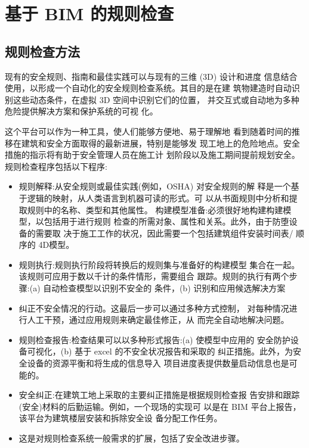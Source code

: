 \section{基于 BIM 的规则检查}
\subsection{规则检查方法}
现有的安全规则、指南和最佳实践可以与现有的三维 (3D) 设计和进度
信息结合使用，以形成一个自动化的安全规则检查系统。其目的是在建
筑物建造时自动识别这些动态条件，在虚拟 3D 空间中识别它们的位置，
并交互式或自动地为多种危险提供解决方案和保护系统的可视
化。

这个平台可以作为一种工具，使人们能够方便地、易于理解地
看到随着时间的推移在建筑和安全方面取得的最新进展，特别是能够发
现工地上的危险地点。安全措施的指示将有助于安全管理人员在施工计
划阶段以及施工期间提前规划安全。规则检查程序包括以下程序:

\begin{itemize}
    \item 规则解释:从安全规则或最佳实践(例如，OSHA) 对安全规则的解
    释是一个基于逻辑的映射，从人类语言到机器可读的形式。可
    以从书面规则中分析和提取规则中的名称、类型和其他属性。
    构建模型准备:必须很好地构建构建模型，以包括用于进行规则
    检查的所需对象、属性和关系。此外，由于防堕设备的需要取
    决于施工工作的状况，因此需要一个包括建筑组件安装时间表/
    顺序的 4D模型。
    \item 规则执行:规则执行阶段将转换后的规则集与准备好的构建模型
    集合在一起。该规则可应用于数以千计的条件情形，需要组合
    跟踪。规则的执行有两个步骤:(a) 自动检查模型以识别不安全的
    条件，(b) 识别和应用候选解决方案
    \item 纠正不安全情况的行动。这最后一步可以通过多种方式控制，
    对每种情况进行人工干预，通过应用规则来确定最佳修正，从
    而完全自动地解决问题。
    \item 规则检查报告:检查结果可以以多种形式报告:(a) 使模型中应用的
    安全防护设备可视化，(b) 基于 excel 的不安全状况报告和采取的
    纠正措施。此外，为安全设备的资源平衡和将生成的信息导入
    项目进度表提供数量启动信息也是可能的。
    \item 安全纠正:在建筑工地上采取的主要纠正措施是根据规则检查报
    告安排和跟踪(安全)材料的后勤运输。例如，一个现场的实现可
    以是在 BIM 平台上报告，该平台为建筑楼层安装和拆除安全设
    备分配工作任务。
    \item 这是对规则检查系统一般需求的扩展，包括了安全改进步骤。
\end{itemize}

